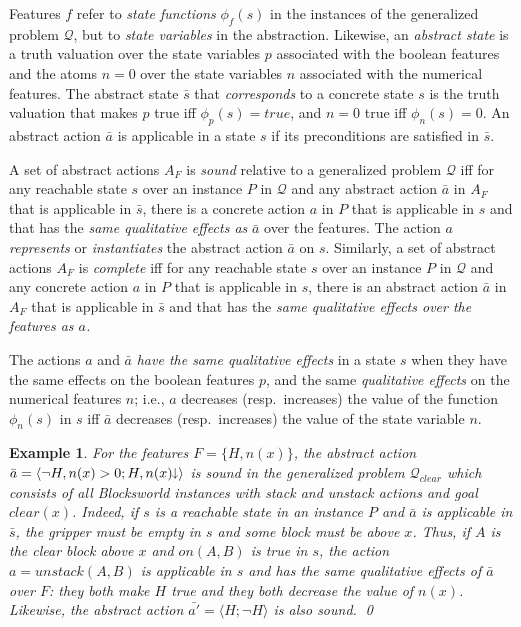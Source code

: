 \documentclass[letterpaper]{article} %
\newcommand{\tup}[1]{\langle #1 \rangle}
\newtheorem{example}[definition]{Example}
\newcommand{\Q}{\mathcal{Q}}
\newcommand{\abst}[2]{\tup{#1;#2}}
\newcommand{\mminus}{\hspace{-.05em}\raisebox{.15ex}{\footnotesize$\downarrow$}}
\begin{document}
Features $f$ refer to \emph{state functions} $\phi_f(s)$ in the instances
of the generalized problem $\Q$, but to \emph{state variables} in the
abstraction. Likewise, an \emph{abstract state} is  a truth valuation over
the state variables $p$ associated with the boolean features and the atoms
$n=0$ over the state variables $n$ associated with the numerical features.
The abstract state $\bar{s}$ that \emph{corresponds} to a concrete state $s$
is the truth valuation that makes $p$ true iff $\phi_p(s)=true$, and $n=0$
true iff $\phi_n(s) = 0$. An abstract action $\bar{a}$ is applicable in
a state $s$ if its preconditions are satisfied in $\bar{s}$.

A set of abstract actions $A_F$ is \emph{sound} relative to a generalized
problem $\Q$ iff for any reachable state $s$ over an instance $P$ in $\Q$
and any abstract action $\bar{a}$ in $A_F$ that is applicable in $\bar{s}$,
there is a concrete action $a$ in $P$ that is applicable in $s$ and that
has the \emph{same qualitative effects as} $\bar{a}$ over the features.
The action $a$ \emph{represents} or \emph{instantiates} the abstract action
$\bar{a}$ on $s$. 
%
Similarly, a set of abstract actions $A_F$ is \emph{complete} iff for any
reachable state $s$ over an instance $P$ in $\Q$ and any concrete action $a$
in $P$ that is applicable in $s$, there is an abstract action $\bar{a}$ in
$A_F$ that is applicable in $\bar{s}$ and that has the \emph{same qualitative
effects over the features as $a$.}

The actions $a$ and $\bar{a}$ \emph{have the same qualitative effects} in
a state $s$ when they have the same effects on the boolean features $p$,
and the same \emph{qualitative effects} on the numerical features $n$; i.e.,
$a$ decreases (resp.\ increases) the value of the function $\phi_n(s)$ in
$s$ iff $\bar{a}$ decreases (resp.\ increases) the value of the state
variable  $n$.

\begin{example}
  For the features $F=\{H,n(x)\}$, the abstract action $\bar{a}=\abst{\neg H,n(x)>0}{H,n(x)\mminus}$ 
  is sound in the generalized problem $\Q_{clear}$ which consists of all
  Blocksworld instances with stack and unstack actions and goal $clear(x)$.
  Indeed, if $s$ is a reachable state in an instance $P$ and $\bar{a}$ is
  applicable in $\bar{s}$, the gripper must be empty in $s$ and some
  block must be above $x$. Thus, if $A$ is the clear block above $x$ and
  $on(A,B)$ is true in $s$, the action $a=unstack(A,B)$ is applicable in
  $s$ and has the same qualitative effects of $\bar{a}$ over $F$: they
  both make $H$ true and they both decrease the value of $n(x)$.
  Likewise, the abstract action $\bar{a'}=\abst{H}{\neg H}$ is also sound. \qed
\end{example}
\end{document}
